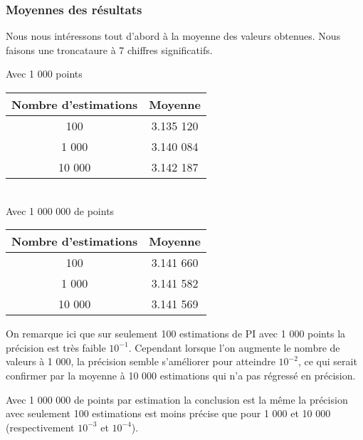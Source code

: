 \documentclass[a4paper]{article}
\begin{document}
\begin{mdframed}[backgroundcolor=light-gray, roundcorner=20pt,
	leftmargin=-45, rightmargin=-45, 
	innerleftmargin=20, innertopmargin=1, innerbottommargin=1, 
	outerlinewidth=1, linecolor=darkgray]
	
\end{mdframed}

\subsubsection{Moyennes des résultats}
Nous nous intéressons tout d'abord à la moyenne des valeurs obtenues. Nous faisons une troncataure à 7 chiffres significatifs.
\smallskip
	
\begin{multicols}{2}
	\begin{center}
		Avec 1 000 points \\
		\begin{tabular}{|c||c|}
			\hline
			Nombre d'estimations & Moyenne
			\\\hline
			100 & 3.135 120
			\\\hline
			1 000 & 3.140 084
			\\\hline
			10 000 & 3.142 187
			\\\hline
		\end{tabular}\\
		Avec 1 000 000 de points \\
		\begin{tabular}{|c||c|}
			\hline
			Nombre d'estimations & Moyenne
			\\\hline
			100 & 3.141 660
			\\\hline
			1 000 & 3.141 582
			\\\hline
			10 000 & 3.141 569
			\\\hline
		\end{tabular}
	\end{center}
\end{multicols}

On remarque ici que sur seulement 100 estimations de PI avec 1 000 points la précision est très faible $10^{-1}$.
Cependant lorsque l'on augmente le nombre de valeurs à 1 000, la précision semble s'améliorer pour atteindre $10^{-2}$, 
ce qui serait confirmer par la moyenne à 10 000 estimations qui n'a pas régressé en précision.

Avec 1 000 000 de points par estimation la conclusion est la même la précision avec seulement 100 estimations est moins 
précise que pour 1 000 et 10 000 (respectivement $10^{-3}$ et $10^{-4}$).
\end{document}
